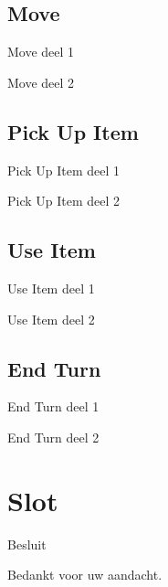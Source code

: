 \documentclass[t]{beamer}
\begin{document}
\subsection{Move}
\begin{frame}{Move deel 1}
\begin{center}
\end{center}
\end{frame}

\begin{frame}{Move deel 2}
\begin{center}
\end{center}
\end{frame}

\subsection{Pick Up Item}
\begin{frame}{Pick Up Item deel 1}
\begin{center}
\end{center}
\end{frame}

\begin{frame}{Pick Up Item deel 2}
\begin{center}
\end{center}
\end{frame}


\subsection{Use Item}
\begin{frame}{Use Item deel 1}
\begin{center}
\end{center}
\end{frame}

\begin{frame}{Use Item deel 2}
\begin{center}
\end{center}
\end{frame}

\subsection{End Turn}
\begin{frame}{End Turn deel 1}
\begin{center}
\end{center}
\end{frame}

\begin{frame}{End Turn deel 2}
\begin{center}
\end{center}
\end{frame}


\section{Slot}
\begin{frame}{Besluit}
\vspace{0.8in}
\begin{center}
Bedankt voor uw aandacht.
\end{center}
\end{frame}
\end{document}

